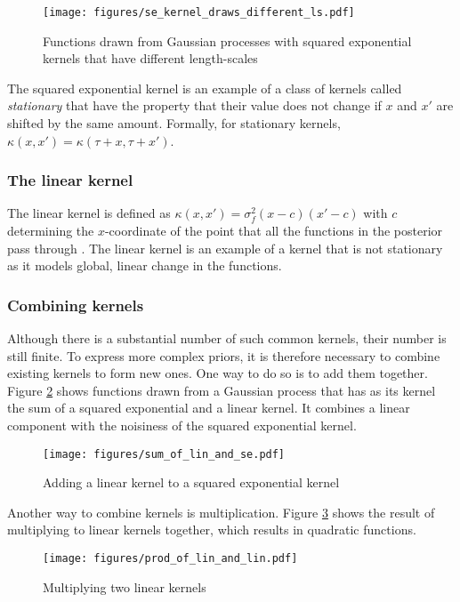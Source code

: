 \documentclass[a4paper,12pt,twoside,openright]{report}
\begin{document}
\begin{figure}
\centering
  \texttt{[image: figures/se\_kernel\_draws\_different\_ls.pdf]}
  \caption{Functions drawn from Gaussian processes with squared exponential kernels that have different length-scales}
  \label{sekernel_draws_different_ls}
\end{figure}

The squared exponential kernel is an example of a class of kernels called \emph{stationary} that have the property that their value does not change if $x$ and $x'$ are shifted by the same amount. Formally, for stationary kernels, $\kappa(x, x') = \kappa(\tau + x, \tau + x')$. 


\subsubsection{The linear kernel}
The linear kernel is defined as $\kappa(x, x') = \sigma_f^2(x-c)(x'-c)$ with $c$ determining the $x$-coordinate of the point that all the functions in the posterior pass through \cite{duvenaudthesis}. The linear kernel is an example of a kernel that is not stationary as it models global, linear change in the functions.


\subsubsection{Combining kernels}
Although there is a substantial number of such common kernels, their number is still finite. To express more complex priors, it is therefore necessary to combine existing kernels to form new ones. One way to do so is to add them together. Figure \ref{sum_of_lin_and_se} shows functions drawn from a Gaussian process that has as its kernel the sum of a squared exponential and a linear kernel. It combines a linear component with the noisiness of the squared exponential kernel.

\begin{figure}
\centering
  \texttt{[image: figures/sum\_of\_lin\_and\_se.pdf]}
  \caption{Adding a linear kernel to a squared exponential kernel}
  \label{sum_of_lin_and_se}
\end{figure}

Another way to combine kernels is multiplication. Figure \ref{prod_of_lin_and_lin} shows the result of multiplying to linear kernels together, which results in quadratic functions.

\begin{figure}
\centering
  \texttt{[image: figures/prod\_of\_lin\_and\_lin.pdf]}
  \caption{Multiplying two linear kernels}
  \label{prod_of_lin_and_lin}
\end{figure}
\end{document}
